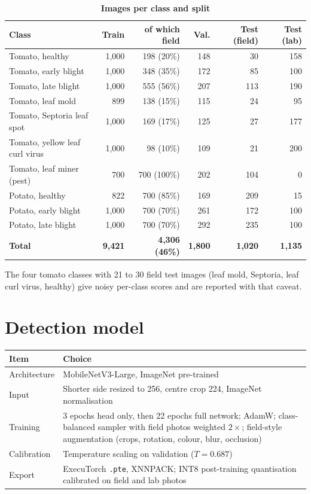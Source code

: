 \documentclass[11pt,a4paper]{article}
\newcommand{\hdr}[1]{\textbf{#1}}
\begin{document}
\begin{table}[H]
\centering
\small
\caption*{\textbf{Images per class and split}}
\begin{tabular}{@{}lrrrrr@{}}
\toprule
\hdr{Class} & \hdr{Train} & \hdr{of which field} & \hdr{Val.} & \hdr{Test (field)} & \hdr{Test (lab)} \\
\midrule
Tomato, healthy & 1,000 & 198 (20\%) & 148 & 30 & 158 \\
Tomato, early blight & 1,000 & 348 (35\%) & 172 & 85 & 100 \\
Tomato, late blight & 1,000 & 555 (56\%) & 207 & 113 & 190 \\
Tomato, leaf mold & 899 & 138 (15\%) & 115 & 24 & 95 \\
Tomato, Septoria leaf spot & 1,000 & 169 (17\%) & 125 & 27 & 177 \\
Tomato, yellow leaf curl virus & 1,000 & 98 (10\%) & 109 & 21 & 200 \\
Tomato, leaf miner (pest) & 700 & 700 (100\%) & 202 & 104 & 0 \\
Potato, healthy & 822 & 700 (85\%) & 169 & 209 & 15 \\
Potato, early blight & 1,000 & 700 (70\%) & 261 & 172 & 100 \\
Potato, late blight & 1,000 & 700 (70\%) & 292 & 235 & 100 \\
\midrule
\textbf{Total} & \textbf{9,421} & \textbf{4,306 (46\%)} & \textbf{1,800} & \textbf{1,020} & \textbf{1,135} \\
\bottomrule
\end{tabular}
\end{table}

The four tomato classes with 21 to 30 field test images (leaf mold, Septoria,
leaf curl virus, healthy) give noisy per-class scores and are reported with that
caveat.

\section{Detection model}

\begin{table}[H]
\centering
\begin{tabularx}{\textwidth}{@{}l L@{}}
\toprule
\hdr{Item} & \hdr{Choice} \\
\midrule
Architecture & MobileNetV3-Large, ImageNet pre-trained \\
Input & Shorter side resized to 256, centre crop 224, ImageNet normalisation \\
Training & 3 epochs head only, then 22 epochs full network; AdamW; class-balanced sampler with field photos weighted $2\times$; field-style augmentation (crops, rotation, colour, blur, occlusion) \\
Calibration & Temperature scaling on validation ($T = 0.687$) \\
Export & ExecuTorch \texttt{.pte}, XNNPACK; INT8 post-training quantisation calibrated on field and lab photos \\
\bottomrule
\end{tabularx}
\end{table}
\end{document}
